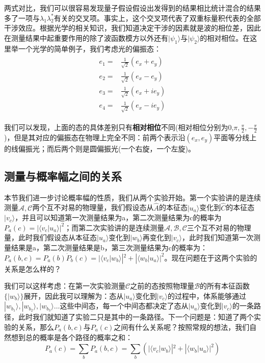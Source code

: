     两式对比，我们可以很容易发现量子假设假设出发得到的结果相比统计混合的结果多了一项与$\lambda_1\lambda_2^*$有关的交叉项。事实上，这个交叉项代表了双重标量积代表的全部干涉效应。根据光学的相关知识，我们知道决定干涉的因素就是波的相位差，因此在测量结果中起重要作用的除了波函数模方以外还有$|\psi_1\rangle$与$|\psi_2\rangle$的相对相位。在这里举一个光学的简单例子，我们考虑光的偏振态：\begin{align}
        \begin{split}
            e_1=&\frac{1}{\sqrt{2}}(e_x+e_y)\\
            e_2=&\frac{1}{\sqrt{2}}(e_x-e_y)\\
            e_3=&\frac{1}{\sqrt{2}}(e_x+ie_y)\\
            e_4=&\frac{1}{\sqrt{2}}(e_x-ie_y)
        \end{split}
    \end{align}
    
    我们可以发现，上面的态的具体差别只有\textbf{相对相位}不同(相对相位分别为0,$\pi,\frac{\pi}{2},-\frac{\pi}{2}$)，但是其对应的偏振态在物理上完全不同：前两个表示沿$(e_x,e_y)$平面等分线上的线偏振光；而后两个则是圆偏振光(一个右旋，一个左旋)。
    \subsection{测量与概率幅之间的关系}
    本节我们进一步讨论概率幅的性质，我们从两个实验开始。第一个实验讲的是连续测量$\mathscr{A},\mathscr{C}$两个互不对易的物理量，我们假设态从$\hat{A}$的本征态$|u_a\rangle$变化到$\hat{C}$的本征态$|v_c\rangle$，并且可以知道第一次测量结果为a，第二次测量结果为c的概率为$P_a(c)=|\langle v_c|u_a\rangle|^2$；而第二次实验讲的是连续测量$\mathscr{A},\mathscr{B},\mathscr{C}$三个互不对易的物理量，此时我们假设态从本征态$|u_a\rangle$变化到$|w_b\rangle$再变化到$|v_c\rangle$，此时我们知道第一次测量结果是a，第二次测量结果是b，第三次测量结果为c的概率为：$P_a(b,c)=P_a(b)\dot P_b(c)=|\langle v_c|w_b\rangle|^2+|\langle w_b|u_a\rangle|^2$。现在问题在于这两个实验的关系是怎么样的？
    
    我们可以这样考虑：在第一次实验测量$\mathscr{C}$之前的态按照物理量$\mathscr{B}$的所有本征函数$\{|w_b\rangle\}$展开，因此我可以理解为：态从$|u_a\rangle$变化到$|v_c\rangle$的过程中，体系能够通过$|w_{b_1}\rangle,|w_{b_2}\rangle,|w_{b_3}\rangle\dots$这些中间态，每一个中间态都决定了态从$|u_a\rangle$变化到$|v_c\rangle$的一条路径，此时我们就知道了实验二只是其中的一条路径。下一个问题是：知道了两个实验的关系，那么$P_a(b,c)$与$P_a(c)$之间有什么关系呢？按照常规的想法，我们自然想到总的概率是各个路径的概率之和：
    \begin{equation}
        P_a(c)=\sum_b P_a(b,c)=\sum_b(|\langle v_c|w_b\rangle|^2+|\langle w_b|u_a\rangle|^2)
    \end{equation}
    
